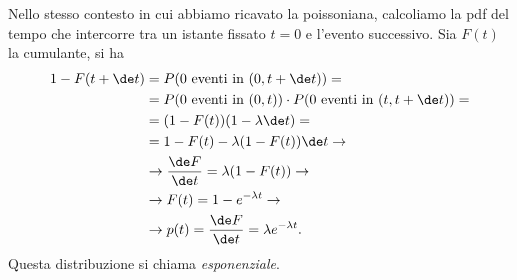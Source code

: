 Nello stesso contesto in cui abbiamo ricavato la poissoniana,
calcoliamo la pdf del tempo che intercorre tra un istante fissato $t=0$ e l'evento successivo.
Sia $F(t)$ la cumulante, si ha
\begin{align*}
	1-F(t+\de t)
	&= P(\text{$0$ eventi in $(0,t+\de t)$}) = \\
	&= P(\text{$0$ eventi in $(0,t)$}) \cdot P(\text{$0$ eventi in $(t,t+\de t)$}) = \\
	&= (1-F(t)) (1-\lambda\de t) = \\
	&= 1 - F(t) - \lambda(1-F(t))\de t \rightarrow \\
	&\rightarrow \frac{\de F}{\de t} = \lambda(1-F(t)) \rightarrow \\
	&\rightarrow F(t) = 1 - e^{-\lambda t} \rightarrow \\
	&\rightarrow p(t) = \frac{\de F}{\de t} = \lambda e^{-\lambda t}.
\end{align*}
Questa distribuzione si chiama \emph{esponenziale}.

